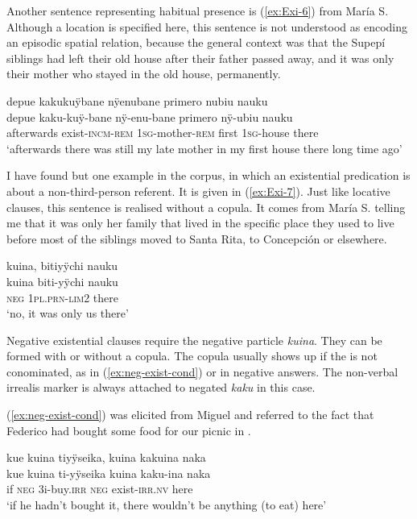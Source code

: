 Another sentence representing habitual presence is (\ref{ex:Exi-6}) from María S. Although a location is specified here, this sentence is not understood as encoding an episodic spatial relation, because the general context was that the Supepí siblings had left their old house after their father passed away, and it was only their mother who stayed in the old house, permanently.

\ea\label{ex:Exi-6}
\begingl
\glpreamble depue kakukuÿbane nÿenubane primero nubiu nauku\\
\gla depue kaku-kuÿ-bane nÿ-enu-bane primero nÿ-ubiu nauku\\
\glb afterwards exist-\textsc{incm}-\textsc{rem} 1\textsc{sg}-mother-\textsc{rem} first 1\textsc{sg}-house there\\
\glft ‘afterwards there was still my late mother in my first house there long time ago’
\endgl
\trailingcitation{[rxx-e120511l.172]}
\xe

I have found but one example in the corpus, in which an existential predication is about a non-third-person referent. It is given in (\ref{ex:Exi-7}). Just like locative clauses, this sentence is realised without a copula. It comes from María S. telling me that it was only her family that lived in the specific place they used to live before most of the siblings moved to Santa Rita, to Concepción or elsewhere.

\ea\label{ex:Exi-7}
\begingl
\glpreamble kuina, bitiyÿchi nauku\\
\gla kuina biti-yÿchi nauku\\
\glb \textsc{neg} 1\textsc{pl.prn}-\textsc{lim}2 there\\
\glft ‘no, it was only us there’
\endgl
\trailingcitation{[rxx-p181101l-2.130]}
\xe

Negative existential clauses require the negative particle \textit{kuina}. They can be formed with or without a copula. The copula usually shows up if the  is not conominated, as in (\ref{ex:neg-exist-cond}) or in negative answers. The non-verbal irrealis marker is always attached to negated \textit{kaku} in this case.

(\ref{ex:neg-exist-cond}) was elicited from Miguel and referred to the fact that Federico had bought some food for our picnic in .

\ea\label{ex:neg-exist-cond}
\begingl 
\glpreamble kue kuina tiyÿseika, kuina kakuina naka\\
\gla kue kuina ti-yÿseika kuina kaku-ina naka\\ 
\glb if \textsc{neg} 3i-buy.\textsc{irr} \textsc{neg} exist-\textsc{irr.nv} here\\ 
\glft ‘if he hadn’t bought it, there wouldn’t be anything (to eat) here’\\ 
\endgl
{}
\xe

